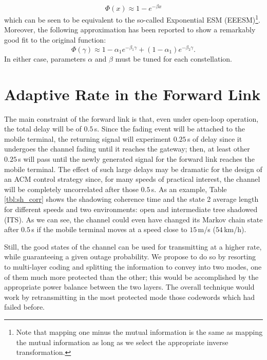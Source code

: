 \documentclass[journal,onecolumn,10pt,a4paper]{IEEEtran}
\begin{document}
\begin{equation}\label{eq:ap1}
\Phi(x) \approx 1-e^{-\beta x}
\end{equation}
which can  be seen to be equivalent to the so-called Exponential ESM (EEESM)\footnote{Note that mapping one minus the mutual information is the same as mapping the mutual information as long as we select the appropriate inverse transformation.}. Moreover, the following approximation has been reported to show a remarkably good fit to the original function:
\begin{equation}\label{eq:ap2}
  \Phi(\gamma) \approx 1-\alpha_1e^{-\beta_1\gamma}+(1-\alpha_1)e^{-\beta_2\gamma}.
\end{equation}
In either case, parameters $\alpha$ and $\beta$ must be tuned for each constellation.
\section{Adaptive Rate in the Forward Link}
\label{sec:fl}

The main constraint of the forward link is that, even under open-loop operation, the total delay will be of $0.5$\,s. Since the fading event will be attached to the mobile terminal, the returning signal will experiment $0.25$\,s of delay since it undergoes the channel fading until it reaches the gateway; then, at least other $0.25$\,s will pass until the newly generated signal for the forward link reaches the mobile terminal. The effect of such large delays may be dramatic for the design of an ACM control strategy since, for many speeds of practical interest, the channel will be completely uncorrelated after those $0.5$\,s. As an example, Table \ref{tbl:sh_corr} shows the shadowing coherence time and the state 2 average length for different speeds and two environments: open and intermediate tree shadowed (ITS). As we can see, the channel could even have changed its Markov chain state after $0.5$\,s if the mobile terminal moves at a speed close to $15$\,m/s ($54$\,km/h).

Still, the good states of the channel can be used for transmitting at a higher rate, while guaranteeing a given outage probability. We propose to do so by resorting to multi-layer coding and splitting the information
to convey into two modes, one of them much more protected than the other; this would
be accomplished by the appropriate power balance between the two layers. The overall technique
would work by retransmitting in the most protected mode those codewords which had
failed before. 
\end{document}
